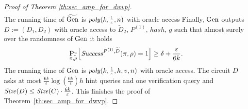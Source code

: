 \begin{proof}[Proof of Theorem \ref{th:sec_amp_for_dwvp}]
\begin{align}
\end{align}
The running time of $\widetilde{\operatorname{\text{Gen}}}$ is $\operatorname{\mathit{poly}}(k, \frac{1}{\varepsilon}, n)$ with oracle access
Finally, $\operatorname{\text{Gen}}$ outputs $D := (D_1, D_2)$ with oracle access to $\widetilde{D}_2$, $P^{(1)}$, $hash$, $g$ such that almost surely over
the randomness of $\operatorname{\text{Gen}}$ it holds
\begin{align*}
    \underset{\pi, \rho}{\Pr}\left[\operatorname{\mathit{Success}}^{P^{(1)},\widetilde{D}}(\pi, \rho) = 1\right] \geq \delta + \frac{\varepsilon}{6k}.
\end{align*}
The running time of $\operatorname{\text{Gen}}$ is $\operatorname{\mathit{poly}}(k,\frac{1}{\varepsilon},h,v,n)$ with oracle access.
The circuit $D$ asks at most $\frac{6k}{\epsilon} \log(\frac{6k}{\epsilon})h$ hint queries and one verification query and
$\operatorname{\mathit{Size}}(D) \leq \operatorname{\mathit{Size}}(C) \cdot \frac{6k}{\varepsilon}$.
This finishes the proof of Theorem~\ref{th:sec_amp_for_dwvp}.
\end{proof}

